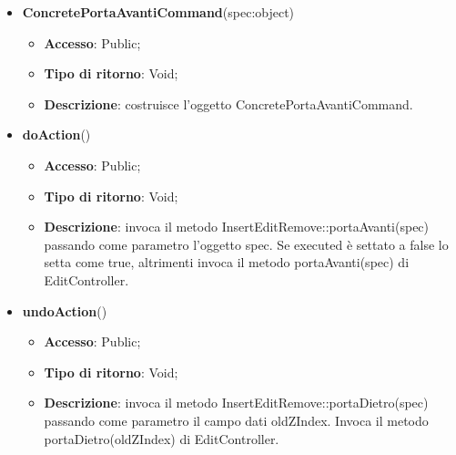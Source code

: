 {{{			
			\begin{itemize}
				\item \textbf{ConcretePortaAvantiCommand}(spec:object)
				\begin{itemize}
					\item \textbf{Accesso}: Public;
					\item \textbf{Tipo di ritorno}: Void;
					\item \textbf{Descrizione}: costruisce l’oggetto ConcretePortaAvantiCommand.
				\end{itemize}
				\item \textbf{doAction}()
				\begin{itemize}
					\item \textbf{Accesso}: Public;
					\item \textbf{Tipo di ritorno}: Void;
					\item \textbf{Descrizione}: invoca il metodo InsertEditRemove::portaAvanti(spec) passando come parametro l'oggetto spec. Se executed è settato a false lo setta come true, altrimenti invoca il metodo portaAvanti(spec) di EditController.
				\end{itemize}
				\item \textbf{undoAction}()
				\begin{itemize}
					\item \textbf{Accesso}: Public;
					\item \textbf{Tipo di ritorno}: Void;
					\item \textbf{Descrizione}: invoca il metodo InsertEditRemove::portaDietro(spec) passando come parametro il campo dati oldZIndex. Invoca il metodo portaDietro(oldZIndex) di EditController.
				\end{itemize}
			\end{itemize}
	}

}}
